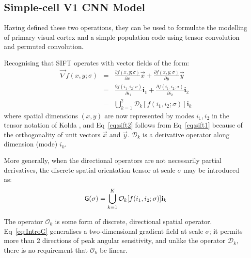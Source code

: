 \subsection{Simple-cell V1 CNN Model}


Having defined these two operations, they can be used to formulate the modelling of primary visual cortex and a simple population code using tensor convolution and permuted convolution. 

Recognising that SIFT operates with vector fields of the form:
\begin{eqnarray}
\label{eq:sift1}
\vec{\nabla} f(x,y;\sigma) &=& \frac{\partial f(x,y;\sigma)}{\partial x}\vec{x} + \frac{\partial f(x,y;\sigma)}{\partial y}\vec{y}\nonumber \\
&=& \frac{\partial f(i_1,i_2;\sigma)}{\partial i_1}\mathbf{i}_1 + \frac{\partial f(i_1,i_2;\sigma)}{\partial i_2}\mathbf{i}_2\\
\label{eq:sift2}
&=& \bigcup_{k=1}^2 \mathcal{D}_k [ f(i_1,i_2;\sigma) ] \mathbf{i}_k 
\end{eqnarray}
where spatial dimensions $(x,y)$ are now represented by modes $i_1,i_2$ in the tensor notation of Kolda \citep{kolda2009tensor}, and Eq~\ref{eq:sift2} follows from Eq~\ref{eq:sift1} because of the orthogonality of unit vectors $\vec{x}$ and $\vec{y}$.  $\mathcal{D}_k$ is a derivative operator along dimension (mode) $i_k$. 

More generally, when the directional operators are not necessarily partial derivatives, the discrete spatial orientation tensor at scale $\sigma$ may be introduced as:
\begin{equation}
\mathsf{G(\sigma)}  = \bigcup_{k=1}^K \mathcal{O}_k [ f(i_1,i_2;\sigma) ] \mathbf{i}_k 
\label{eq:IntroG}
\end{equation}

The operator $\mathcal{O}_k$ is some form of discrete, directional spatial operator. Eq~\ref{eq:IntroG} generalises a two-dimensional gradient field at scale $\sigma$; it permits more than 2 directions of peak angular sensitivity, and unlike the operator $\mathcal{D}_k$, there is no requirement that $\mathcal{O}_k$ be linear.

